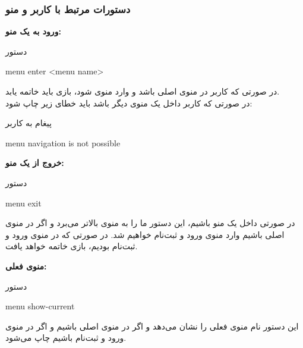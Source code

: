 \documentclass[]{article}
\begin{document}
\subsubsection*{{\titr دستورات مرتبط با کاربر و منو}}
\vspace{.5cm}
\textbf{ورود به یک منو:}
\begin{mybox}[colback=yellow]{دستور}
	\begin{latin}	
		menu enter <menu name>
	\end{latin}
\end{mybox}
در صورتی که کاربر در منوی اصلی باشد و وارد منوی  شود، بازی باید 
خاتمه یابد.
\\
در صورتی که کاربر داخل یک منوی دیگر باشد باید خطای زیر چاپ شود:
\\
\begin{mybox}[colback=yellow]{پیغام به کاربر}
	\begin{latin}	
		menu navigation is not possible
	\end{latin}
\end{mybox}

\vspace{.5cm}
\textbf{خروج از یک منو:}
\begin{mybox}[colback=yellow]{دستور}
	\begin{latin}	
		menu exit
	\end{latin}
\end{mybox}
در صورتی داخل یک منو باشیم، این دستور ما را به منوی بالاتر می‌برد و اگر در 
منوی اصلی باشیم وارد منوی ورود و ثبت‌نام خواهیم شد. در صورتی که در منوی 
ورود 
و ثبت‌نام بودیم، بازی خاتمه خواهد یافت.

\vspace{.5cm}
\textbf{منوی فعلی:}
\begin{mybox}[colback=yellow]{دستور}
	\begin{latin}	
		menu show-current 
	\end{latin}
\end{mybox}
این دستور نام منوی فعلی را نشان می‌دهد و اگر در منوی اصلی باشیم 
 و اگر در منوی ورود و ثبت‌نام باشیم  چاپ می‌شود.
\end{document}
